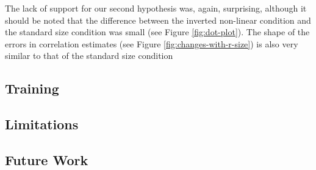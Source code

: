 \documentclass{vgtc}                          %
\begin{document}
The lack of support for our second hypothesis was, again, surprising, although it should be noted that
the difference between the inverted non-linear condition and the standard size
condition was small (see Figure \ref{fig:dot-plot}). The shape of the errors
in correlation estimates (see Figure \ref{fig:changes-with-r-size}) is also
very similar to that of the standard size condition

\hypertarget{training}{%
\subsection{Training}\label{training}}

\hypertarget{limitations}{%
\subsection{Limitations}\label{limitations}}

\hypertarget{future-work}{%
\subsection{Future Work}\label{future-work}}


%

%
%
%


\end{document}
